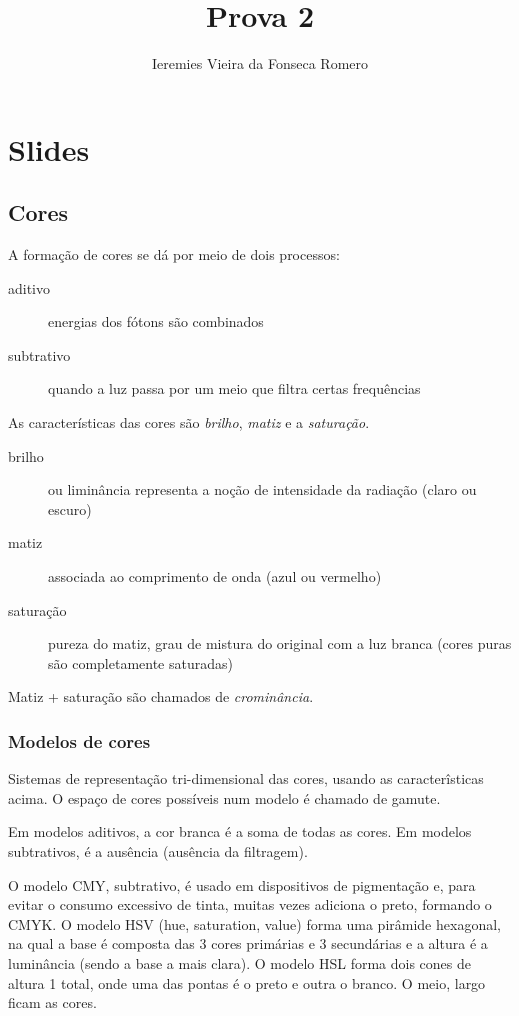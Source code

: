 \documentclass[twocolumn, 9pt]{article}
\author{Ieremies Vieira da Fonseca Romero}
\date{}
\title{Prova 2}
\begin{document}
\maketitle

\section*{Slides}
\label{sec:orgc5de01d}
\subsection*{Cores}
\label{sec:org14fa4aa}
A formação de cores se dá por meio de dois processos:
\begin{description}
\item[{aditivo}] energias dos fótons são combinados
\item[{subtrativo}] quando a luz passa por um meio que filtra certas frequências
\end{description}

As características das cores são \emph{brilho}, \emph{matiz} e a \emph{saturação}.
\begin{description}
\item[{brilho}] ou liminância representa a noção de intensidade da radiação (claro ou escuro)
\item[{matiz}] associada ao comprimento de onda (azul ou vermelho)
\item[{saturação}] pureza do matiz, grau de mistura do original com a luz branca (cores puras são completamente saturadas)
\end{description}

Matiz + saturação são chamados de \emph{crominância}.

\subsubsection*{Modelos de cores}
\label{sec:orgc6e6d64}
Sistemas de representação tri-dimensional das cores, usando as caracterîsticas acima.
O espaço de cores possíveis num modelo é chamado de gamute.

Em modelos aditivos, a cor branca é a soma de todas as cores.
Em modelos subtrativos, é a ausência (ausência da filtragem).

O modelo CMY, subtrativo, é usado em dispositivos de pigmentação e, para evitar o consumo excessivo de tinta, muitas vezes adiciona o preto, formando o CMYK.
O modelo HSV (hue, saturation, value) forma uma pirâmide hexagonal, na qual a base é composta das 3 cores primárias e 3 secundárias e a altura é a luminância (sendo a base a mais clara).
O modelo HSL forma dois cones de altura 1 total, onde uma das pontas é o preto e outra o branco.
O meio, largo ficam as cores.
\end{document}
